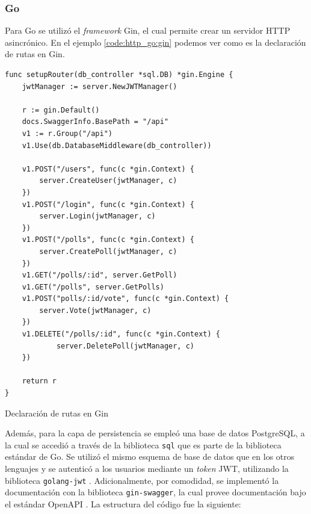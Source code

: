 \documentclass[11pt]{article}
\let\Oldsubsubsection\subsubsection
\renewcommand{\subsubsection}{\FloatBarrier\Oldsubsubsection}
\newcommand{\english}[1]{\textit{#1}}
\begin{document}
\subsubsection{Go}

Para Go se utilizó el \english{framework} Gin\cite{http:go:gin}, el cual permite crear un servidor HTTP asincrónico. En el ejemplo \ref{code:http_go:gin} podemos ver como es la declaración de rutas en Gin.

\begin{listing}
\begin{verbatim}
func setupRouter(db_controller *sql.DB) *gin.Engine {
	jwtManager := server.NewJWTManager()

	r := gin.Default()
	docs.SwaggerInfo.BasePath = "/api"
	v1 := r.Group("/api")
	v1.Use(db.DatabaseMiddleware(db_controller))
	
	v1.POST("/users", func(c *gin.Context) {
		server.CreateUser(jwtManager, c)
	})
	v1.POST("/login", func(c *gin.Context) {
		server.Login(jwtManager, c)
	})
	v1.POST("/polls", func(c *gin.Context) {
		server.CreatePoll(jwtManager, c)
	})
	v1.GET("/polls/:id", server.GetPoll)
	v1.GET("/polls", server.GetPolls)
	v1.POST("polls/:id/vote", func(c *gin.Context) {
		server.Vote(jwtManager, c)
	})
	v1.DELETE("/polls/:id", func(c *gin.Context) {
            server.DeletePoll(jwtManager, c)
	})

	return r
}
\end{verbatim}
\caption{Declaración de rutas en Gin}
\label{code:http_go:gin}
\end{listing}

Además, para la capa de persistencia se empleó una base de datos PostgreSQL, a la cual se accedió a través de la biblioteca \lstinline{sql} \cite{http:go:sql} que es parte de la biblioteca estándar de Go. Se utilizó el mismo esquema de base de datos que en los otros lenguajes y se autenticó a los usuarios mediante un \english{token} JWT, utilizando la biblioteca \lstinline{golang-jwt} \cite{http:go:jwt}. Adicionalmente, por comodidad, se implementó la documentación con la biblioteca \lstinline{gin-swagger}, la cual provee documentación bajo el estándar OpenAPI \cite{http:ex:openapi}. La estructura del código fue la siguiente:
\end{document}
